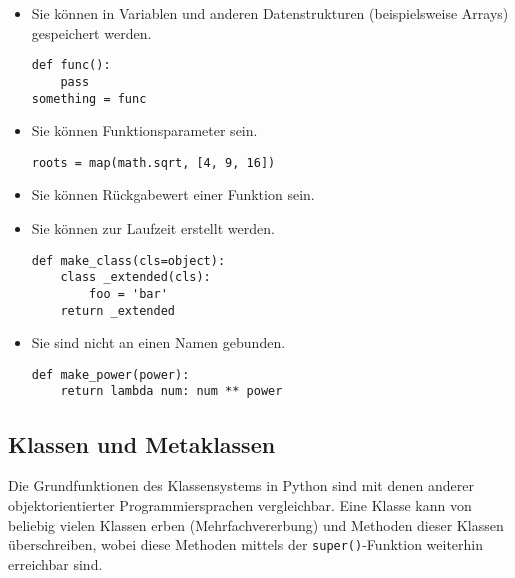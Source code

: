 \begin{itemize}
\item Sie können in Variablen und anderen Datenstrukturen (beispielsweise Arrays) gespeichert werden.
\begin{lstlisting}[caption=Zuweisung einer Funktion an eine Variable]
def func():
    pass
something = func
\end{lstlisting}

\item Sie können Funktionsparameter sein.
\begin{lstlisting}[caption=Funktion als Funktionsparameter]
roots = map(math.sqrt, [4, 9, 16])
\end{lstlisting}

\item Sie können Rückgabewert einer Funktion sein.

\item Sie können zur Laufzeit erstellt werden.
\begin{lstlisting}[caption=Klasse wird zur Laufzeit erstellt]
def make_class(cls=object):
    class _extended(cls):
        foo = 'bar'
    return _extended
\end{lstlisting}

\item Sie sind nicht an einen Namen gebunden.
\begin{lstlisting}[caption=Anonyme lambda-Funktion]
def make_power(power):
    return lambda num: num ** power
\end{lstlisting}
\end{itemize}



\subsection{Klassen und Metaklassen}
Die Grundfunktionen des Klassensystems in Python sind mit denen anderer objektorientierter
Programmiersprachen vergleichbar. Eine Klasse kann von beliebig vielen Klassen erben
(Mehrfachvererbung) und Methoden dieser Klassen überschreiben, wobei diese Methoden mittels der
\lstinline{super()}-Funktion weiterhin erreichbar sind.

